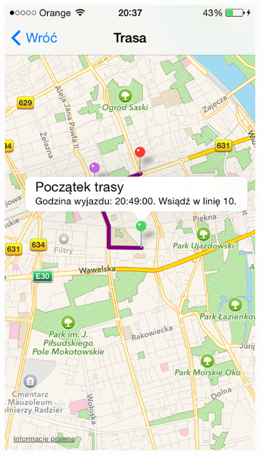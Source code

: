 \documentclass[a4paper,12pt]{article}
\begin{document}
	\begin{figure}[ht!]
		\centering
		\begin{minipage}{.45\textwidth}
			\centering
  			\includegraphics[width=\linewidth, height=.4\textheight,keepaspectratio]{graphics/snapshots/result_screen_one.png}
  			\label{fig:result_screen_one}
		\end{minipage} \hfill
		\begin{minipage}{.45\textwidth}

\end{minipage}
\end{figure}
\end{document}
